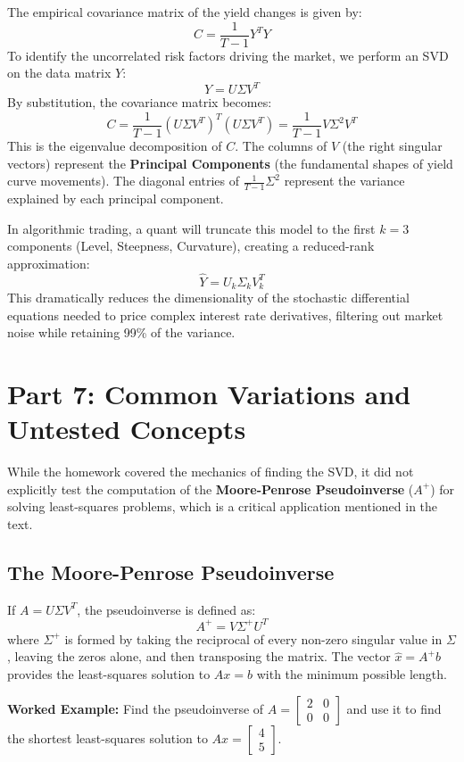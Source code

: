 \documentclass[11pt, letterpaper]{article}
\theoremstyle{definition}
\theoremstyle{remark}
\begin{document}
The empirical covariance matrix of the yield changes is given by:
\[
C = \frac{1}{T-1} Y^T Y
\]
To identify the uncorrelated risk factors driving the market, we perform an SVD on the data matrix $Y$:
\[
Y = U \Sigma V^T
\]
By substitution, the covariance matrix becomes:
\[
C = \frac{1}{T-1} (U \Sigma V^T)^T (U \Sigma V^T) = \frac{1}{T-1} V \Sigma^2 V^T
\]
This is the eigenvalue decomposition of $C$. The columns of $V$ (the right singular vectors) represent the \textbf{Principal Components} (the fundamental shapes of yield curve movements). The diagonal entries of $\frac{1}{T-1}\Sigma^2$ represent the variance explained by each principal component.

In algorithmic trading, a quant will truncate this model to the first $k=3$ components (Level, Steepness, Curvature), creating a reduced-rank approximation:
\[
\hat{Y} = U_k \Sigma_k V_k^T
\]
This dramatically reduces the dimensionality of the stochastic differential equations needed to price complex interest rate derivatives, filtering out market noise while retaining 99\% of the variance.

\newpage
\section{Part 7: Common Variations and Untested Concepts}

While the homework covered the mechanics of finding the SVD, it did not explicitly test the computation of the \textbf{Moore-Penrose Pseudoinverse} ($A^+$) for solving least-squares problems, which is a critical application mentioned in the text.

\subsection{The Moore-Penrose Pseudoinverse}
If $A = U \Sigma V^T$, the pseudoinverse is defined as:
\[
A^+ = V \Sigma^+ U^T
\]
where $\Sigma^+$ is formed by taking the reciprocal of every non-zero singular value in $\Sigma$, leaving the zeros alone, and then transposing the matrix. The vector $\hat{x} = A^+ b$ provides the least-squares solution to $Ax = b$ with the minimum possible length.

\textbf{Worked Example:}
Find the pseudoinverse of $A = \begin{bmatrix} 2 & 0 \\ 0 & 0 \end{bmatrix}$ and use it to find the shortest least-squares solution to $Ax = \begin{bmatrix} 4 \\ 5 \end{bmatrix}$.
\end{document}
